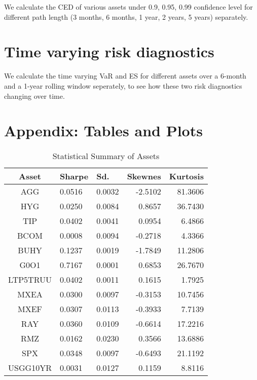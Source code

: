 \documentclass[12pt]{article}
\begin{document}
We calculate the CED of various assets under 0.9, 0.95, 0.99 confidence level for different path length (3 months, 6 months, 1 year, 2 years, 5 years) separately.

\section{Time varying risk diagnostics}

We calculate the time varying VaR and ES  for different assets over a 6-month and a 1-year rolling window seperately, to see how these two risk diagnostics changing over time.


\section{Appendix: Tables and Plots}


\begin{table}[!h]
\caption{Statistical Summary of Assets} %
\centering 
\begin{tabular}{ | c || p{1.5cm} p{1.5cm} r r | } 
 \hline
Asset & Sharpe  & Sd. & Skewnes & Kurtosis \\
  \hline \hline
AGG & 0.0516 & 0.0032 & -2.5102 & 81.3606\\ 
HYG & 0.0250 & 0.0084 &  0.8657 & 36.7430\\ 
TIP & 0.0402 & 0.0041 &  0.0954 &  6.4866\\ 
BCOM & 0.0008 & 0.0094 & -0.2718 &  4.3366\\ 
BUHY & 0.1237 & 0.0019 & -1.7849 & 11.2806\\ 
G0O1 & 0.7167 & 0.0001 &  0.6853 & 26.7670\\ 
LTP5TRUU & 0.0402 & 0.0011 &  0.1615 &  1.7925\\ 
MXEA & 0.0300 & 0.0097 & -0.3153 & 10.7456\\ 
MXEF & 0.0307 & 0.0113 & -0.3933 &  7.7139\\ 
RAY & 0.0360 & 0.0109 & -0.6614 & 17.2216\\ 
RMZ & 0.0162 & 0.0230 &  0.3566 & 13.6886\\ 
SPX & 0.0348 & 0.0097 & -0.6493 & 21.1192\\ 
USGG10YR & 0.0031 & 0.0127 &  0.1159 &  8.8116 \\
 \hline
\end{tabular}
\label{table:statSum}
\end{table}
\end{document}
